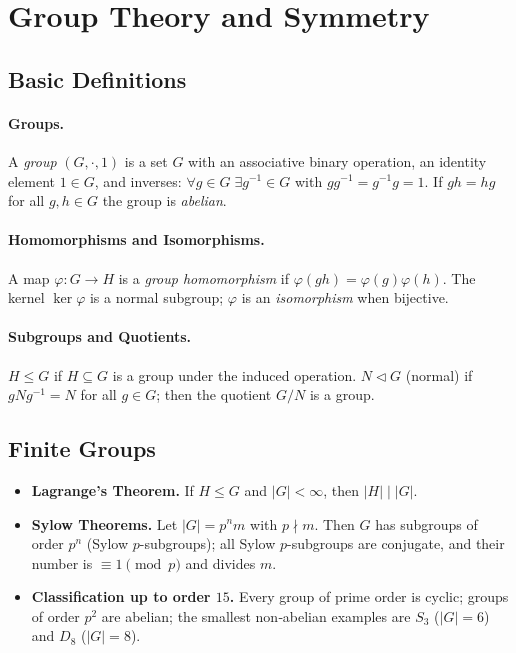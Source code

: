 \section{Group Theory and Symmetry}

\subsection{Basic Definitions}

\paragraph{Groups.}
A \emph{group} \((G,\cdot,1)\) is a set \(G\) with an associative binary operation, an identity element \(1\in G\), and inverses:  
\(\forall g\in G\;\exists g^{-1}\in G\) with \(gg^{-1}=g^{-1}g=1\).  
If \(gh=hg\) for all \(g,h\in G\) the group is \emph{abelian}.

\paragraph{Homomorphisms and Isomorphisms.}
A map \(\varphi:G\!\to H\) is a \emph{group homomorphism} if
\(\varphi(gh)=\varphi(g)\varphi(h)\).  
The kernel \(\ker\varphi\) is a normal subgroup;  
\(\varphi\) is an \emph{isomorphism} when bijective.

\paragraph{Subgroups and Quotients.}
\(H\le G\) if \(H\subseteq G\) is a group under the induced operation.  
\(N\!\lhd\!G\) (normal) if \(gNg^{-1}=N\) for all \(g\in G\); then the quotient \(G/N\) is a group.

\subsection{Finite Groups}

\begin{itemize}
    \item \textbf{Lagrange’s Theorem.}  
          If \(H\le G\) and \(|G|<\infty\), then \(|H|\mid|G|\).
    \item \textbf{Sylow Theorems.}  
          Let \(|G|=p^{n}m\) with \(p\nmid m\).  
          Then \(G\) has subgroups of order \(p^{n}\) (Sylow \(p\)-subgroups);
          all Sylow \(p\)-subgroups are conjugate, and their number is \(\equiv 1\pmod{p}\) and divides \(m\).
    \item \textbf{Classification up to order \(15\).}
          Every group of prime order is cyclic;  
          groups of order \(p^{2}\) are abelian;  
          the smallest non‑abelian examples are \(S_{3}\) (\(|G|=6\)) and \(D_{8}\) (\(|G|=8\)).
\end{itemize}

